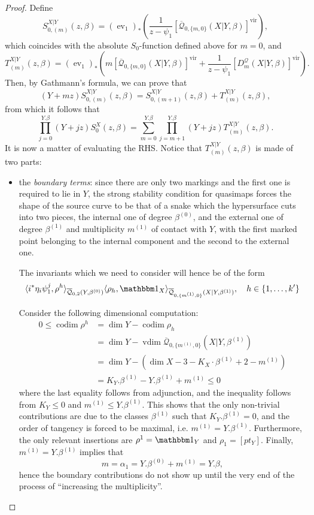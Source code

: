 \documentclass[11pt]{amsart}
\newcommand{\Q}[4]{\overline{\mathcal Q}_{#1,#2}(#3,#4)}
\newcommand{\ev}{\operatorname{ev}}
\newcommand{\codim}{\operatorname{codim}}
\newcommand{\vdim}{\operatorname{vdim}}
\theoremstyle{plain}
\theoremstyle{definition}
\begin{document}
\begin{proof}

Define
 \[
  S_{0,(m)}^{X|Y}(z,\beta)=(\ev_1)_*\left(\frac{1}{z-\psi_1}[\Q{0}{\{m,0\}}{X|Y}{\beta}]^\text{vir}\right),
 \]
which coincides with the absolute $S_0$-function defined above for $m=0$, and
\[
 T_{(m)}^{X|Y}(z,\beta)=(\ev_1)_*\left(m[\Q{0}{\{m,0\}}{X|Y}{\beta}]^\text{vir}+\frac{1}{z-\psi_1}[D_m^{\mathcal Q}(X|Y,\beta)]^\text{vir}\right).
\]
Then, by Gathmann's formula, we can prove that
\begin{equation}\label{eqn:G}
 (Y+mz) S_{0,(m)}^{X|Y}(z,\beta) = S_{0,(m+1)}^{X|Y}(z,\beta)+ T_{(m)}^{X|Y}(z,\beta),
\end{equation}
from which it follows that
\[
 \prod_{j=0}^{Y.\beta}(Y+jz) S_0^X(z,\beta) = \sum_{m=0}^{Y.\beta}\prod_{j=m+1}^{Y.\beta}(Y+jz)T_{(m)}^{X|Y}(z,\beta).
\]
It is now a matter of evaluating the RHS. Notice that $T_{(m)}^{X|Y}(z,\beta)$ is made of two parts:
\begin{itemize}[leftmargin=*]
 \item the \emph{boundary terms}: since there are only two markings and the first one is required to lie in $Y$, the strong stability condition for quasimaps forces the shape of the source curve to be that of a snake which the hypersurface cuts into two pieces, the internal one of degree $\beta^{(0)}$, and the external one of degree $\beta^{(1)}$ and multiplicity $m^{(1)}$ of contact with $Y$, with the first marked point belonging to the internal component and the second to the external one.
 
 The invariants which we need to consider will hence be of the form
 \[
  \langle i^*\eta_i\psi_1^j,\rho^h\rangle_{\Q{0}{2}{Y}{\beta^{(0)}}}\langle \rho_h,\mathbbm 1_{X}\rangle_{\Q{0}{\{m^{(1)},0\}}{X|Y}{\beta^{(1)}}}, \quad h\in\{1,\ldots,k'\}
 \]
 
 Consider the following dimensional computation:
\begin{align*}
 0\leq \codim \rho^h &= \dim Y-\codim \rho_h \\
 &= \dim Y-\vdim \Q{0}{\{m^{(1)},0\}}{X|Y}{\beta^{(1)}} \\
 &= \dim Y-(\dim X-3-K_{X}\cdot \beta^{(1)}+2-m^{(1)})\\
 &= K_Y.\beta^{(1)}-Y.\beta^{(1)}+m^{(1)}\leq 0
\end{align*}
 where the last equality follows from adjunction, and the inequality follows from $K_Y\leq 0$ and $m^{(1)}\leq Y.\beta^{(1)}$.
This shows that the only non-trivial contributions are due to the classes $\beta^{(1)}$ such that $K_Y.\beta^{(1)}=0$, and the order of tangency is forced to be maximal, i.e. $m^{(1)}=Y.\beta^{(1)}$. Furthermore, the only relevant insertions are $\rho^1=\mathbbm 1_Y$ and $\rho_1=[pt_Y]$. Finally, $m^{(1)}=Y.\beta^{(1)}$ implies that
\[
 m=\alpha_1=Y.\beta^{(0)}+m^{(1)}=Y.\beta,
\]
hence the boundary contributions do not show up until the very end of the process of ``increasing the multiplicity''.


\end{itemize}
\end{proof}
\end{document}
